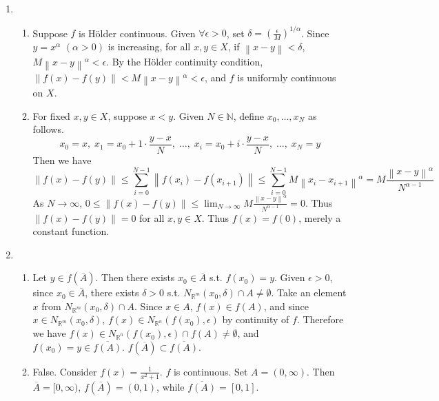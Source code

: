\documentclass[11pt]{report}
\newcommand{\norm}[1]{\left\lVert#1\right\rVert}
\newcommand{\ra}{\rightarrow}
\newcommand{\ds}{\displaystyle}
\newcommand{\R}{\mathbb{R}}
\newcommand{\N}{\mathbb{N}}
\begin{document}
\begin{enumerate}
\item
\begin{enumerate}
	\item Suppose $f$ is Hölder continuous. Given $\forall \epsilon > 0$, set $\delta = \left(\frac{\epsilon}{M}\right)^{1/\alpha}$. Since $y = x^\alpha$ $(\alpha > 0)$ is increasing, for all $x, y\in X$, if $\norm{x - y} < \delta$, $M\norm{x - y}^\alpha < \epsilon$. By the Hölder continuity condition, $\norm{f(x) - f(y)} < M\norm{x - y}^\alpha <\epsilon$, and $f$ is uniformly continuous on $X$.
	\item For fixed $x, y\in X$, suppose $x < y$. Given $N\in \N$, define $x_0, \dots, x_N$ as follows. $$x_0 = x,\; x_1 = x_0 +1\cdot \frac{y-x}{N},\; \dots, \;x_i = x_0 + i\cdot \frac{y-x}{N},\; \dots,\; x_N = y$$
	Then we have
	$$\norm{f(x) - f(y)} \leq \sum_{i=0}^{N-1}\norm{f(x_i) - f(x_{i+1})} \leq \sum_{i=0}^{N-1} M\norm{x_i - x_{i+1}}^\alpha = M  \frac{\norm{x- y}^\alpha}{N^{\alpha-1}}$$
	As $N\ra \infty$, $0 \leq \norm{f(x)- f(y)} \ds\leq \lim_{N\ra\infty}  M  \frac{\norm{x- y}^\alpha}{N^{\alpha-1}} = 0$. Thus $\norm{f(x) - f(y)} = 0$ for all $x, y\in X$. Thus $f(x) = f(0)$, merely a constant function.
\end{enumerate}

\item
\begin{enumerate}
	\item Let $y\in f(\overline{A})$. Then there exists $x_0\in \overline{A}$ s.t. $f(x_0) = y$. Given $\epsilon > 0$, since $x_0\in \overline{A}$, there exists $\delta > 0$ s.t. $N_{\R^m}(x_0, \delta)\cap A \neq \emptyset$. Take an element $x$ from $N_{\R^m}(x_0, \delta) \cap A$. Since $x\in A $, $f(x) \in f(A)$, and since $x\in N_{\R^m}(x_0, \delta) $, $ f(x) \in N_{\R^n}(f(x_0), \epsilon)$ by continuity of $f$. Therefore we have $f(x) \in N_{\R^n}(f(x_0), \epsilon) \cap f(A) \neq \emptyset$, and $f(x_0) = y\in \overline{f(A)}$. $f(\overline{A}) \subset \overline{f(A)}$.
	\item False. Consider $f(x) = \frac{1}{x^2+1}$. $f$ is continuous. Set $A = (0, \infty)$. Then $\overline{A} = [0, \infty)$, $f(\overline{A}) = (0, 1)$, while $\overline{f(A)} = [0, 1]$.
\end{enumerate}


\end{enumerate}
\end{document}
